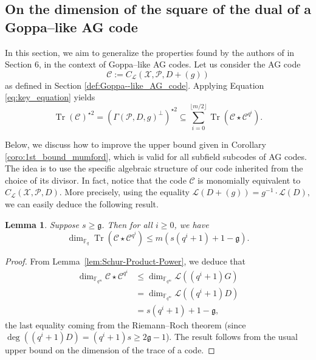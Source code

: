 \documentclass[peerreview]{IEEEtran}
\theoremstyle{plain}
\newtheorem{lemma}[thm]{Lemma}
\theoremstyle{definition}
\theoremstyle{remark}
\DeclareMathOperator{\trace}{Tr}
\newcommand{\calP}{\mathcal{P}}
\newcommand{\calL}{\mathcal{L}}
\newcommand{\calC}{\mathcal{C}}
\newcommand{\calX}{\mathcal{X}}
\newcommand{\fqm}{\mathbb{F}_{q^m}}
\newcommand{\fq}{\mathbb{F}_{q}}
\newcommand{\Tr}[1]{\trace\!\left(#1\right)}
\begin{document}
	\subsection{On the dimension of the square of the dual of a Goppa--like AG code} \label{section:1st_improvement}
	\noindent
	In this section, we aim to generalize the properties found by the authors of \cite{MT21} in Section 6, in the context of Goppa--like AG codes. Let us consider the AG code 
	$$\calC := C_{\calL}(\calX,\calP,D+(g))$$
	as defined in Section \ref{def:Goppa--like_AG_code}. Applying Equation \eqref{eq:key_equation} yields   
	\begin{equation} \label{eq:key_equation_Goppa--like} 
		\Tr{\calC}^{\star 2} = (\Gamma(\calP,D,g)^{\perp})^{\star2} \subseteq \sum\limits_{i=0}^{\lfloor{m/2} \rfloor} \Tr{\calC\star \calC^{q^i}}.
	\end{equation}
	
	Below, we discuss how to improve the upper bound given in Corollary \ref{coro:1st_bound_mumford}, which is valid for all subfield subcodes of AG codes. The idea is to use the specific algebraic structure of our code inherited from the choice of its divisor.
	\noindent In fact, notice that the code $\calC$ is monomially equivalent to $C_{\calL}(\calX,\calP,D)$. 
	More precisely, using the equality $\calL(D+(g)) = g^{-1} \cdot \calL(D),$
	we can easily deduce the following result.
	
	\begin{lemma} \label{lem:bound_dim_Tr(C*C^q^i)}
		Suppose $s \geq \mathfrak{g}$. Then for all $i \geq 0$, we have 
		$$\dim_{\fq} \Tr{\calC\star \calC^{q^i}} \leq m\left(s\left(q^i+1\right)+1-\mathfrak{g}\right).$$
	\end{lemma}
	\begin{proof}
		From Lemma~\ref{lem:Schur-Product-Power}, we deduce that 
		\[
		\begin{aligned}
		\dim_{\fqm} \calC\star \calC^{q^i} &\leq \dim_{\fqm} \calL((q^i+1)G) \\
											&= \dim_{\fqm} \calL((q^i+1)D) \\
											&= s(q^i+1)+1-\mathfrak{g},
		\end{aligned}\]
		the last equality coming from the Riemann--Roch theorem (since $\deg \left((q^i+1)D\right) =(q^i+1)s \geq 2\mathfrak{g}-1$). The result follows from the usual upper bound on the dimension of the trace of a code. 
	\end{proof}
	
\end{document}
